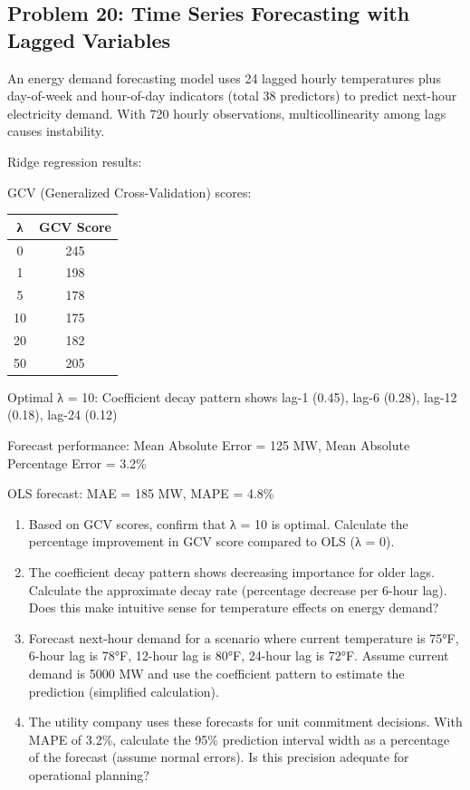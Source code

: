 \documentclass[12pt]{article}
\begin{document}
\subsection*{Problem 20: Time Series Forecasting with Lagged Variables}

An energy demand forecasting model uses 24 lagged hourly temperatures plus day-of-week and hour-of-day indicators (total 38 predictors) to predict next-hour electricity demand. With 720 hourly observations, multicollinearity among lags causes instability.

Ridge regression results:

GCV (Generalized Cross-Validation) scores:
\begin{center}
\begin{tabular}{cc}
\toprule
λ & GCV Score \\
\midrule
0 & 245 \\
1 & 198 \\
5 & 178 \\
10 & 175 \\
20 & 182 \\
50 & 205 \\
\bottomrule
\end{tabular}
\end{center}

Optimal λ = 10: Coefficient decay pattern shows lag-1 (0.45), lag-6 (0.28), lag-12 (0.18), lag-24 (0.12)

Forecast performance: Mean Absolute Error = 125 MW, Mean Absolute Percentage Error = 3.2\%

OLS forecast: MAE = 185 MW, MAPE = 4.8\%

\begin{enumerate}[label=(\alph*)]
\item Based on GCV scores, confirm that λ = 10 is optimal. Calculate the percentage improvement in GCV score compared to OLS (λ = 0).

\item The coefficient decay pattern shows decreasing importance for older lags. Calculate the approximate decay rate (percentage decrease per 6-hour lag). Does this make intuitive sense for temperature effects on energy demand?

\item Forecast next-hour demand for a scenario where current temperature is 75°F, 6-hour lag is 78°F, 12-hour lag is 80°F, 24-hour lag is 72°F. Assume current demand is 5000 MW and use the coefficient pattern to estimate the prediction (simplified calculation).

\item The utility company uses these forecasts for unit commitment decisions. With MAPE of 3.2\%, calculate the 95\% prediction interval width as a percentage of the forecast (assume normal errors). Is this precision adequate for operational planning?
\end{enumerate}
\end{document}
